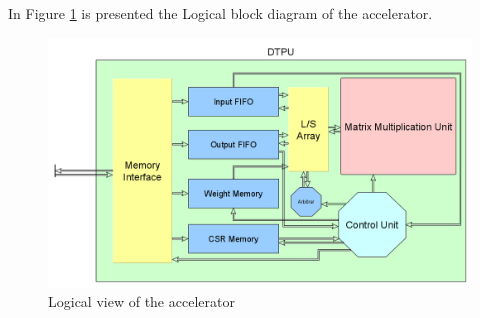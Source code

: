 In Figure \ref{fig:logaccel} is presented the Logical block diagram of the accelerator.
\begin{figure}[!htbp]
\centering
\captionsetup{justification=centering}
\includegraphics[scale=0.40]{./figure/logical_view.png}
\caption{Logical view of the accelerator}
\label{fig:logaccel}
\end{figure}

